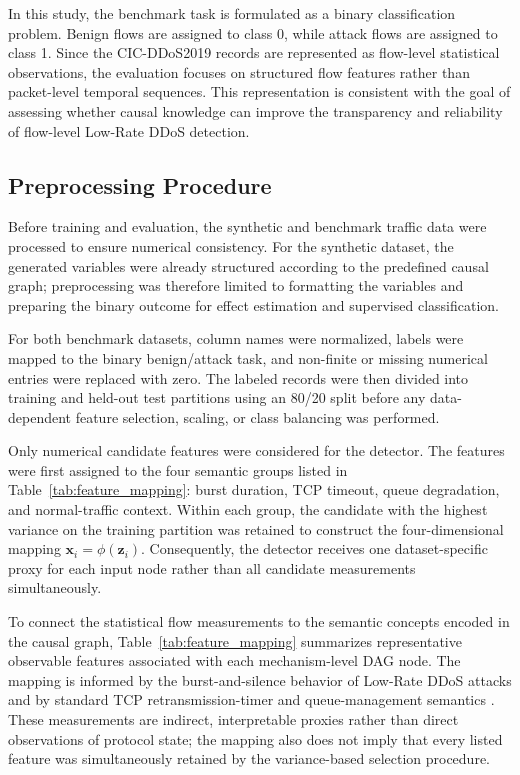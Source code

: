 \documentclass[journal]{IEEEtran}
\begin{document}
In this study, the benchmark task is formulated as a binary classification problem. Benign flows are assigned to class 0, while attack flows are assigned to class 1. Since the CIC-DDoS2019 records are represented as flow-level statistical observations, the evaluation focuses on structured flow features rather than packet-level temporal sequences. This representation is consistent with the goal of assessing whether causal knowledge can improve the transparency and reliability of flow-level Low-Rate DDoS detection.

\subsection{Preprocessing Procedure}


Before training and evaluation, the synthetic and benchmark traffic data were
processed to ensure numerical consistency. For the synthetic dataset, the
generated variables were already structured according to the predefined
causal graph; preprocessing was therefore limited to formatting the variables
and preparing the binary outcome for effect estimation and supervised
classification.

For both benchmark datasets, column names were normalized, labels were mapped
to the binary benign/attack task, and non-finite or missing numerical entries
were replaced with zero. The labeled records were then divided into training
and held-out test partitions using an 80/20 split before any data-dependent
feature selection, scaling, or class balancing was performed.

Only numerical candidate features were considered for the detector. The
features were first assigned to the four semantic groups listed in
Table~\ref{tab:feature_mapping}: burst duration, TCP timeout, queue
degradation, and normal-traffic context. Within each group, the candidate with
the highest variance on the training partition was retained to construct the
four-dimensional mapping $\mathbf{x}_i=\phi(\mathbf{z}_i)$. Consequently, the
detector receives one dataset-specific proxy for each input node rather than
all candidate measurements simultaneously.

To connect the statistical flow measurements to the semantic concepts encoded
in the causal graph, Table~\ref{tab:feature_mapping} summarizes representative
observable features associated with each mechanism-level DAG node. The
mapping is informed by the burst-and-silence behavior of Low-Rate DDoS attacks
and by standard TCP retransmission-timer and queue-management semantics
\cite{kuzmanovic2003lowrate,rfc6298,rfc7567}. These measurements are indirect,
interpretable proxies rather than direct observations of protocol state; the
mapping also does not imply that every listed feature was simultaneously
retained by the variance-based selection procedure.
\end{document}
